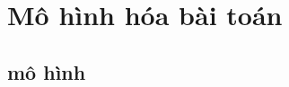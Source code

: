 \chapter{Mô hình hóa bài toán}

\section{mô hình}


\begin{figure}
	\centering
	\def\svgwidth{\columnwidth}
%	
%	
	
\end{figure}